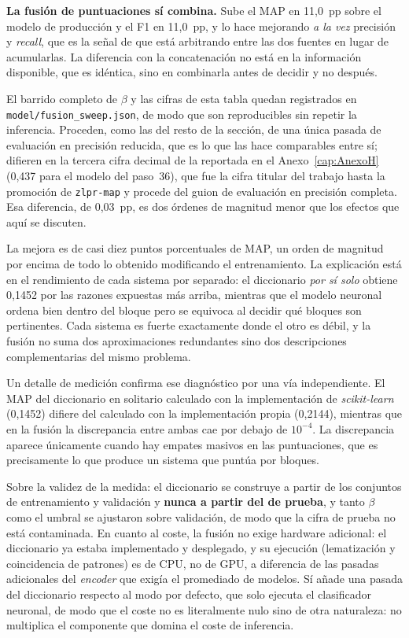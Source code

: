 \textbf{La fusión de puntuaciones sí combina.} Sube el MAP en 11{,}0~pp sobre el modelo de producción y el F1 en 11{,}0~pp, y lo hace mejorando \emph{a la vez} precisión y \emph{recall}, que es la señal de que está arbitrando entre las dos fuentes en lugar de acumularlas. La diferencia con la concatenación no está en la información disponible, que es idéntica, sino en combinarla antes de decidir y no después.

El barrido completo de $\beta$ y las cifras de esta tabla quedan registrados en \texttt{model/fusion\_sweep.json}, de modo que son reproducibles sin repetir la inferencia. Proceden, como las del resto de la sección, de una única pasada de evaluación en precisión reducida, que es lo que las hace comparables entre sí; difieren en la tercera cifra decimal de la reportada en el Anexo~\ref{cap:AnexoH} (0{,}437 para el modelo del paso~36), que fue la cifra titular del trabajo hasta la promoción de \texttt{zlpr-map} y procede del guion de evaluación en precisión completa. Esa diferencia, de 0{,}03~pp, es dos órdenes de magnitud menor que los efectos que aquí se discuten.

La mejora es de casi diez puntos porcentuales de MAP, un orden de magnitud por encima de todo lo obtenido modificando el entrenamiento. La explicación está en el rendimiento de cada sistema por separado: el diccionario \emph{por sí solo} obtiene 0{,}1452 por las razones expuestas más arriba, mientras que el modelo neuronal ordena bien dentro del bloque pero se equivoca al decidir qué bloques son pertinentes. Cada sistema es fuerte exactamente donde el otro es débil, y la fusión no suma dos aproximaciones redundantes sino dos descripciones complementarias del mismo problema.

Un detalle de medición confirma ese diagnóstico por una vía independiente. El MAP del diccionario en solitario calculado con la implementación de \emph{scikit-learn} (0{,}1452) difiere del calculado con la implementación propia (0{,}2144), mientras que en la fusión la discrepancia entre ambas cae por debajo de $10^{-4}$. La discrepancia aparece únicamente cuando hay empates masivos en las puntuaciones, que es precisamente lo que produce un sistema que puntúa por bloques.

Sobre la validez de la medida: el diccionario se construye a partir de los conjuntos de entrenamiento y validación y \textbf{nunca a partir del de prueba}, y tanto $\beta$ como el umbral se ajustaron sobre validación, de modo que la cifra de prueba no está contaminada. En cuanto al coste, la fusión no exige hardware adicional: el diccionario ya estaba implementado y desplegado, y su ejecución (lematización y coincidencia de patrones) es de CPU, no de GPU, a diferencia de las pasadas adicionales del \emph{encoder} que exigía el promediado de modelos. Sí añade una pasada del diccionario respecto al modo por defecto, que solo ejecuta el clasificador neuronal, de modo que el coste no es literalmente nulo sino de otra naturaleza: no multiplica el componente que domina el coste de inferencia.

